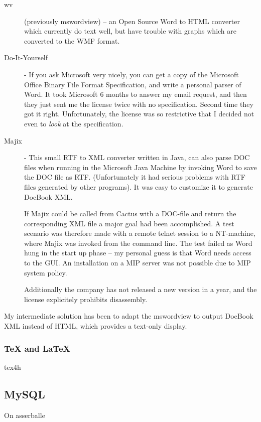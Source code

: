 \begin{description}
\item[wv] (previously mswordview) -- an Open Source Word to
  HTML converter which currently do text well, but have
  trouble with graphs which are converted to the WMF format.
  
\item[Do-It-Yourself] - If you ask Microsoft very nicely,
  you can get a copy of the Microsoft Office Binary File
  Format Specification, and write a personal parser of Word.
  It took Microsoft 6 months to answer my email request, and
  then they just sent me the license twice with no
  specification.  Second time they got it right.
  Unfortunately, the license was so restrictive that I
  decided not even to \textit{look} at the specification.
  
\item[Majix] - This small RTF to XML converter written in
  Java, can also parse DOC files when running in the
  Microsoft Java Machine by invoking Word to save the DOC
  file as RTF.  (Unfortunately it had serious problems with
  RTF files generated by other programs).  It was easy to
  customize it to generate DocBook XML.
  
  If Majix could be called from Cactus with a DOC-file and
  return the corresponding XML file a major goal had been
  accomplished.  A test scenario was therefore made with a
  remote telnet session to a NT-machine, where Majix was
  invoked from the command line.  The test failed as Word
  hung in the start up phase -- my personal guess is that
  Word needs access to the GUI.  An installation on a MIP
  server was not possible due to MIP system policy.
  
  Additionally the company has not released a new version in
  a year, and the license explicitely prohibits disassembly.

\end{description}

My intermediate solution has been to adapt the mswordview to
output DocBook XML instead of HTML, which provides a
text-only display.


\subsubsection{{\TeX} and {\LaTeX}}

\textsf{tex4h}


\subsection{MySQL}
On asserballe

